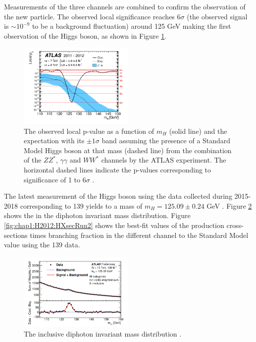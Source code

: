 Measurements of the three channels are combined to confirm the observation of the new particle. The observed local significance reaches $6\sigma$ (the observed signal is $\sim10^{-9}$ to be a background fluctuation) around 125 GeV making the first observation of the Higgs boson, as shown in Figure \ref{fig:chap1:H2012:P0}. 
\begin{figure}[htbp]
    \centering
    \includegraphics[width=0.5\textwidth]{Ch1/Img/Hp0.png}
    \caption{The observed local p-value as a function of $m_H$ (solid line) and the expectation with its $\pm1\sigma$ band assuming the presence of a Standard Model Higgs boson at that mass (dashed line) from the combination of the $ZZ^*$, $\gamma\gamma$ and $WW^*$ channels by the ATLAS experiment. The horizontal dashed lines indicate the p-values corresponding to significance of 1 to 6$\sigma$ \cite{ATLAS_2012}.}
    \label{fig:chap1:H2012:P0}
\end{figure}
The latest measurement of the Higgs boson using the data collected during 2015-2018 corresponding to 139 \ifb yields to a mass of $m_{H}=125.09\pm0.24 $ GeV \cite{Mass}. Figure \ref{fig:chap1:H2012:MyyRun2} shows the in the diphoton invariant mass distribution. Figure \ref{fig:chap1:H2012:HXsecRun2} shows the best-fit values of the production cross-sections times branching fraction in the different channel to the Standard Model value using the 139 \ifb data.\\
\begin{figure}[htbp]
    \centering
    \includegraphics[width=0.5\textwidth]{Ch1/Img/myy_run2.png}
    \caption{The inclusive diphoton invariant mass distribution \cite{ATLAS_2020}.}
    \label{fig:chap1:H2012:MyyRun2}
\end{figure}
